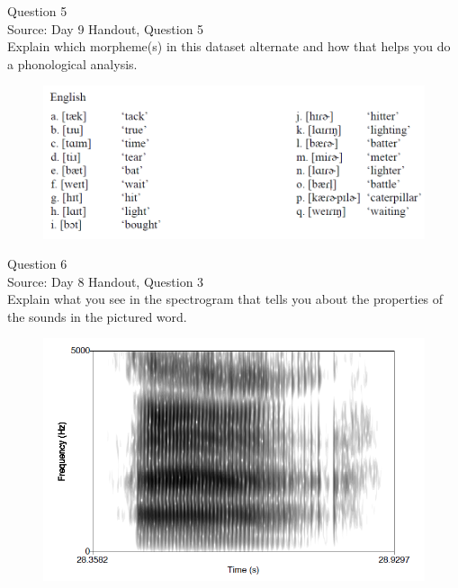 \documentclass[12pt]{article}
\begin{document}
\newpage

{\large Question 5}\\

Source: Day 9 Handout, Question 5\\

Explain which morpheme(s) in this dataset alternate and how that helps you do a phonological analysis.\\

\begin{figure}[H]
\includegraphics{../images/english_t_flap.png}
\end{figure}

\newpage

{\large Question 6}\\

Source: Day 8 Handout, Question 3\\

Explain what you see in the spectrogram that tells you about the properties of the sounds in the pictured word.\\

\begin{figure}[H]
\includegraphics{../images/spectrogram_aaah.png}
\end{figure}
\end{document}
